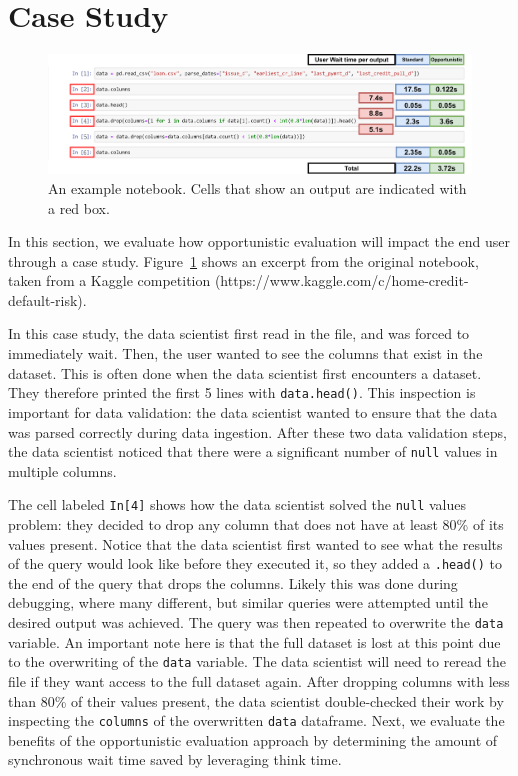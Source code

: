 \documentclass[11pt]{article}
\newcommand{\code}[1]{\texttt{#1}}
\newcommand{\thinktime}[0]{think time\xspace}
\begin{document}
\newpage

\section{Case Study}

\begin{figure}
    \centering
         \centering
         \includegraphics[width=\textwidth]{submissions/interactivity/figures/case_study_before.pdf}
         \caption{
         An example notebook. Cells that show an output are indicated with a red box.
         }
         \label{fig:case_study_before}
\end{figure}

In this section, we evaluate how opportunistic evaluation will impact the end user
through a case study. Figure~\ref{fig:case_study_before} shows an excerpt from
the original notebook, taken from a Kaggle competition (https://www.kaggle.com/c/home-credit-default-risk). 

In this case study, the data scientist first read in the file, and was forced to immediately
wait. Then, the user wanted to see the columns that exist in the dataset. This is
often done when the data scientist first encounters a dataset. They therefore
printed the first 5 lines with \code{data.head()}. This inspection is important for
data validation: the data scientist wanted to ensure that the data was parsed
correctly during data ingestion. After these two data validation steps, the data scientist
noticed that there were a significant number of \code{null} values in multiple
columns. 

The cell labeled \code{In[4]}
shows
how the data scientist solved the \code{null} values problem: they decided to drop any
column that does not have at least 80\% of its values present. Notice
that the data scientist first wanted to see what the results of the query
would look like before they executed it, so
they added a \code{.head()} to the end of the query that drops the columns.
Likely this was done during debugging, where many different, but similar queries
were attempted until the desired output was achieved. The query was then
repeated to overwrite the \code{data} variable. An important note here is that
the full dataset is lost at this point due to the overwriting of the \code{data}
variable. The data scientist will need to reread the file if they want access to 
the full dataset again. After dropping columns with less than 80\% of their values
present, the data scientist
double-checked their work by inspecting the \code{columns} of the overwritten
\code{data} dataframe.
Next, we evaluate the benefits of the opportunistic evaluation approach by determining the amount of
synchronous wait time saved by leveraging \thinktime.
\end{document}
